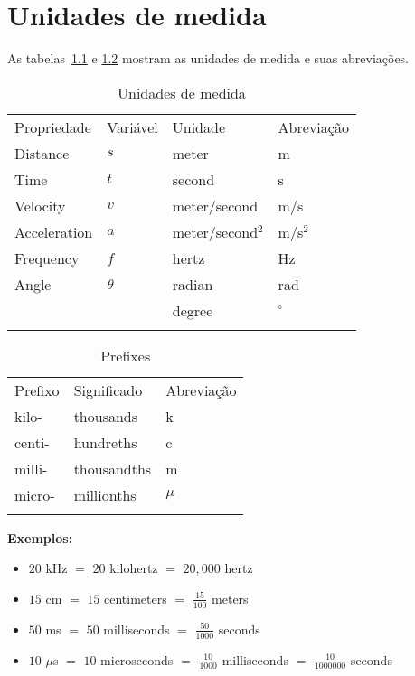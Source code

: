 
\chapter{Unidades de medida}\label{ch.units}

As tabelas~\ref{tab.units} e \ref{tab.prefixes} mostram as unidades de medida e suas abreviações.

\begin{table}
\caption{Unidades de medida}
\label{tab.units}
\begin{tabular}{p{2cm}p{1.5cm}p{2.5cm}p{2cm}}
\hline\noalign{\smallskip}
Propriedade & Variável & Unidade & Abreviação\\
\noalign{\smallskip}\hline\noalign{\smallskip}
Distance & $s$ & meter  & m\\
Time &  $t$ & second & s\\
Velocity & $v$ & meter/second &  m/s\\
Acceleration & $a$ & meter/second$^2$ & m/s$^2$\\
Frequency & $f$ & hertz & Hz\\
Angle & $\theta$ & radian & rad\\
& & degree & $^\circ$\\
\noalign{\smallskip}\hline\noalign{\smallskip}
\end{tabular}
\end{table}

\begin{table}
\caption{Prefixes}
\label{tab.prefixes}
\begin{tabular}{p{1.5cm}p{2.2cm}p{1.7cm}}
\hline\noalign{\smallskip}
Prefixo & Significado & Abreviação \\
\noalign{\smallskip}\hline\noalign{\smallskip}
kilo- & thousands & k\\
centi- & hundreths & c\\
milli- & thousandths & m\\
micro- & millionths & $\mu$\\
\noalign{\smallskip}\hline\noalign{\smallskip}
\end{tabular}
\end{table}

\noindent\textbf{Exemplos:}

\begin{itemize}\setlength{\itemsep}{6pt}
\item $20$ kHz $=$ $20$ kilohertz $=$ $20,000$ hertz
\item $15$ cm $=$ $15$ centimeters $=$ $\frac{15}{100}$ meters
\item $50$ ms $=$ $50$ milliseconds $=$ $\frac{50}{1000}$ seconds
\item $10$ $\mu$s $=$ $10$ microseconds $=$ $\frac{10}{1000}$ milliseconds $=$ $\frac{10}{1000000}$ seconds
\end{itemize}

